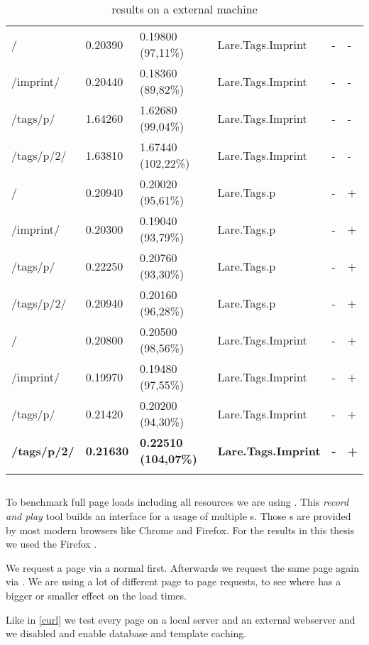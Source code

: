 \begin{center}
\begin{longtable}{llllll}
	\hline
	/ & 0.20390 & 0.19800 (97,11\%) & Lare.Tags.Imprint & - & - \\
	/imprint/ & 0.20440 & 0.18360 (89,82\%) & Lare.Tags.Imprint & - & - \\
	/tags/p/ & 1.64260 & 1.62680 (99,04\%) & Lare.Tags.Imprint & - & - \\
	/tags/p/2/ & 1.63810 & 1.67440 (102,22\%) & Lare.Tags.Imprint & - & - \\
	\hline
	\hline
	/ & 0.20940 & 0.20020 (95,61\%) & Lare.Tags.p & - & + \\
	/imprint/ & 0.20300 & 0.19040 (93,79\%) & Lare.Tags.p & - & + \\
	/tags/p/ & 0.22250 & 0.20760 (93,30\%) & Lare.Tags.p & - & + \\
	/tags/p/2/ & 0.20940 & 0.20160 (96,28\%) & Lare.Tags.p & - & + \\
	\hline
	/ & 0.20800 & 0.20500 (98,56\%) & Lare.Tags.Imprint & - & + \\
	/imprint/ & 0.19970 & 0.19480 (97,55\%) & Lare.Tags.Imprint & - & + \\
	/tags/p/ & 0.21420 & 0.20200 (94,30\%) & Lare.Tags.Imprint & - & + \\
	\textbf{/tags/p/2/} & \textbf{0.21630} & \textbf{0.22510 (104,07\%)} & \textbf{Lare.Tags.Imprint} & \textbf{-} & \textbf{+} \\
	\hline
\caption{\curl{} results on a external machine}
\label{tab:curl_results_external}
\end{longtable}
\end{center}

\subsection{\selenium{}\label{selenium}}

To benchmark full page loads including all resources we are using \selenium{}.
This \emph{record and play} tool builds an interface for a usage of multiple \webdriver{}s.
Those \webdriver{}s are provided by most modern browsers like Chrome and Firefox.
For the results in this thesis we used the Firefox \webdriver{}.

We request a page via a normal \httpRequest{} first.
Afterwards we request the same page again via \lare{}.
We are using a lot of different page to page requests, to see where \lare{} has a bigger or smaller effect on the load times.

Like in \ref{curl} we test every page on a local server and an external webserver and we disabled and enable database and template caching.

